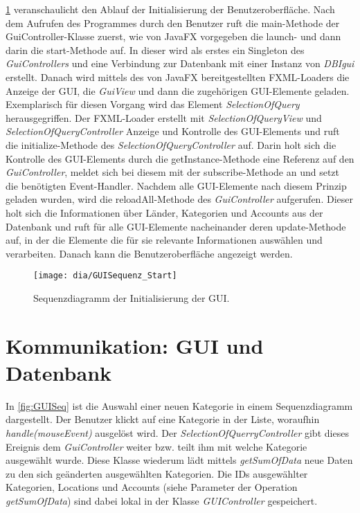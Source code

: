 \cref{fig:GUIStartSeq} veranschaulicht den Ablauf der Initialisierung der Benutzeroberfläche. Nach dem Aufrufen des Programmes durch den Benutzer ruft die main-Methode der GuiController-Klasse zuerst, wie von JavaFX vorgegeben die launch- und dann darin die start-Methode auf.
In dieser wird als erstes ein Singleton des \emph{GuiControllers} und eine Verbindung zur Datenbank mit einer Instanz von \emph{DBIgui} erstellt. Danach wird mittels des von JavaFX bereitgestellten FXML-Loaders die Anzeige der GUI, die \emph{GuiView} und dann die zugehörigen GUI-Elemente geladen.
Exemplarisch für diesen Vorgang wird das Element \emph{SelectionOfQuery} herausgegriffen.
Der FXML-Loader erstellt mit \emph{SelectionOfQueryView} und \emph{SelectionOfQueryController} Anzeige und Kontrolle des GUI-Elements und ruft die initialize-Methode des \emph{SelectionOfQueryController} auf.
Darin holt sich die Kontrolle des GUI-Elements durch die getInstance-Methode eine Referenz auf den \emph{GuiController}, meldet sich bei diesem mit der subscribe-Methode an und setzt die benötigten Event-Handler.
Nachdem alle GUI-Elemente nach diesem Prinzip geladen wurden, wird die reloadAll-Methode des \emph{GuiController} aufgerufen. Dieser holt sich die Informationen über Länder, Kategorien und Accounts aus der Datenbank und ruft für alle GUI-Elemente nacheinander deren update-Methode auf, in der die Elemente die für sie relevante Informationen auswählen und verarbeiten.
Danach kann die Benutzeroberfläche angezeigt werden.

\begin{figure}[h!]
	\centering
	\texttt{[image: dia/GUISequenz\_Start]}
	\caption{Sequenzdiagramm der Initialisierung der GUI.}
	\label{fig:GUIStartSeq}
\end{figure}
\section{Kommunikation: GUI und Datenbank}
In \cref{fig:GUISeq} ist die Auswahl einer neuen Kategorie in einem Sequenzdiagramm dargestellt. Der Benutzer klickt auf eine Kategorie in der Liste, woraufhin \emph{handle(mouseEvent)} ausgelöst wird. Der \emph{SelectionOfQuerryController} gibt dieses Ereignis dem \emph{GuiController} weiter bzw.  teilt ihm mit welche Kategorie ausgewählt wurde. Diese Klasse wiederum lädt mittels \emph{getSumOfData} neue Daten zu den sich geänderten ausgewählten Kategorien. Die IDs ausgewählter Kategorien, Locations und Accounts (siehe Parameter der Operation \emph{getSumOfData}) sind dabei lokal in der Klasse \emph{GUIController} gespeichert.

